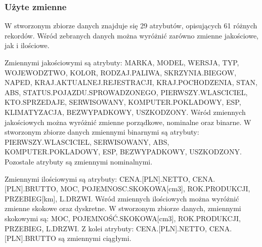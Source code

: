 \documentclass[12pt,a4paper]{report}
\begin{document}
\subsubsection{Użyte zmienne}
\noindent

W stworzonym zbiorze danych znajduje się 29 atrybutów, opisujących 61 różnych rekordów. Wśród zebranych danych można wyróżnić zarówno zmienne jakościowe, jak i ilościowe. 

Zmiennymi jakościowymi są atrybuty: MARKA, MODEL, WERSJA, TYP, WOJEWODZTWO, KOLOR, RODZAJ.PALIWA, SKRZYNIA.BIEGOW, NAPED, 
\newline
KRAJ.AKTUALNEJ.REJESTRACJI, KRAJ.POCHODZENIA, STAN, ABS,
\newline
STATUS.POJAZDU.SPROWADZONEGO, PIERWSZY.WLASCICIEL, KTO.SPRZEDAJE, SERWISOWANY, KOMPUTER.POKLADOWY, ESP, KLIMATYZACJA, BEZWYPADKOWY, USZKODZONY.
\newline
Wśród zmiennych jakościowych można wyróżnić zmienne porządkowe, nominalne oraz binarne. W stworzonym zbiorze danych zmiennymi binarnymi są atrybuty: PIERWSZY.WLASCICIEL, SERWISOWANY, ABS, KOMPUTER.POKLADOWY, ESP, BEZWYPADKOWY, USZKODZONY. Pozostałe atrybuty są zmiennymi nominalnymi.%

Zmiennymi ilościowymi są atrybuty: CENA.[PLN].NETTO, CENA.[PLN].BRUTTO, MOC, POJEMNOSC.SKOKOWA[cm3], ROK.PRODUKCJI, PRZEBIEG[km], L.DRZWI. 
\newline
Wśród zmiennych ilościowych można wyróżnić zmienne skokowe oraz dyskretne. W stworzonym zbiorze danych, zmiennymi skokowymi są: MOC, POJEMNOŚĆ.SKOKOWA[cm3], ROK.PRODUKCJI, PRZEBIEG, L.DRZWI. Z kolei atrybuty: CENA.[PLN].NETTO, CENA.[PLN].BRUTTO są zmiennymi ciągłymi. 










\end{document}
